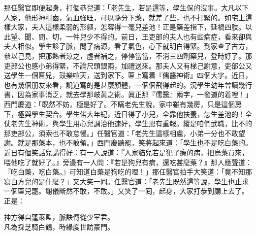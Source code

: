 那任醫官即便起身，打個恭兒道：「老先生，若是這等，學生保的沒事。大凡以下人家，他形神粗鹵，氣血強旺，可以隨分下藥，就差了些，也不打緊的。{}如宅上這樣大家，夫人這樣柔弱的形軀，怎容得一毫兒差池！正是藥差指下，延禍四肢。以此望、聞、問、切，一件兒少不得的。前日，王吏部的夫人也有些病症，看來卻與夫人相似。學生診了脈，問了病源，看了氣色，心下就明白得緊。到家查了古方，叅以己見，把那熱者涼之，虛者補之，停停當當，不消三四劑藥兒，登時好了。那吏部公也感小弟得緊，不論尺頭銀兩，加禮送來。那夫人又有梯己謝意，吏部公又送學生一個匾兒，鼓樂喧天，送到家下。匾上寫着『儒醫神術』四個大字。近日，也有幾個朋友來看，說道寫的是甚麼顏體，{}一個個飛得起的。況學生幼年曾讀幾行書，因為家事消乏，就去學那岐黃之術。眞正那『儒醫』兩字，一發道的着哩！」{}西門慶道：「既然不妨，極是好了。不瞞老先生說，家中雖有幾房，只是這個房下，極與學生契合。學生偌大年紀，近日得了小兒，全靠他扶養，怎生差池的！全仗老先生神術，與學生用心兒調治他速好，學生恩有重報。縱是咱們武職，比不的那吏部公，{}須索也不敢怠慢。」任醫官道：「老先生這樣相處，小弟一分也不敢望謝。就是那藥本，也不敢領。」西門慶聽罷，笑將起來道：「學生也不是吃白藥的。近日有個笑話兒講得好：有一人說道：『人家貓兒若是犯了癩的病，把烏藥買來，喂他吃了就好了。』旁邊有一人問：『若是狗兒有病，還吃甚麼藥？』那人應聲道：『吃白藥，吃白藥。』可知道白藥是狗吃的哩！」那任醫官拍手大笑道：「竟不知那寫白方兒的是什麼？」又大笑一囘。任醫官道：「老先生既然這等說，學生也止求一個匾兒罷。謝儀斷然不敢，不敢。」又笑了一囘，起身，大家打恭到廳上去了。正是：

\begin{myquote}
神方得自蓬萊監，脈訣傳從少室君。\\凡為採芝騎白鶴，時緣度世訪豪門。
\end{myquote}


